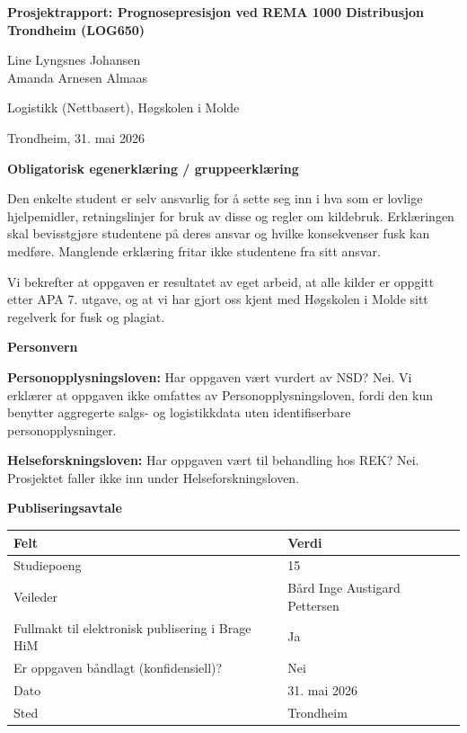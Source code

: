 \documentclass[
  norsk,
  11pt,
  a4paper,
]{article}
\author{}
\date{}
\newcounter{none} %
\begin{document}
\begin{titlepage}
\centering
\vspace*{3cm}
{\LARGE\bfseries Prosjektrapport: Prognosepresisjon ved REMA 1000 Distribusjon Trondheim (LOG650)\par}
\vspace{2.5cm}
{\large Line Lyngsnes Johansen \\ Amanda Arnesen Almaas\par}
\vspace{1cm}
{\large Logistikk (Nettbasert), Høgskolen i Molde\par}
\vspace{0.5cm}
{\large Trondheim, 31. mai 2026\par}
\vfill
\end{titlepage}

\textbf{Obligatorisk egenerklæring / gruppeerklæring}

Den enkelte student er selv ansvarlig for å sette seg inn i hva som er
lovlige hjelpemidler, retningslinjer for bruk av disse og regler om
kildebruk. Erklæringen skal bevisstgjøre studentene på deres ansvar og
hvilke konsekvenser fusk kan medføre. Manglende erklæring fritar ikke
studentene fra sitt ansvar.

Vi bekrefter at oppgaven er resultatet av eget arbeid, at alle kilder er
oppgitt etter APA 7. utgave, og at vi har gjort oss kjent med Høgskolen
i Molde sitt regelverk for fusk og plagiat.

\textbf{Personvern}

\textbf{Personopplysningsloven:} Har oppgaven vært vurdert av NSD? Nei.
Vi erklærer at oppgaven ikke omfattes av Personopplysningsloven, fordi
den kun benytter aggregerte salgs- og logistikkdata uten identifiserbare
personopplysninger.

\textbf{Helseforskningsloven:} Har oppgaven vært til behandling hos REK?
Nei. Prosjektet faller ikke inn under Helseforskningsloven.

\textbf{Publiseringsavtale}

{\def\LTcaptype{none} %
\begin{longtable}[]{@{}ll@{}}
\toprule\noalign{}
Felt & Verdi \\
\midrule\noalign{}
\endhead
\bottomrule\noalign{}
\endlastfoot
Studiepoeng & 15 \\
Veileder & Bård Inge Austigard Pettersen \\
Fullmakt til elektronisk publisering i Brage HiM & Ja \\
Er oppgaven båndlagt (konfidensiell)? & Nei \\
Dato & 31. mai 2026 \\
Sted & Trondheim \\
\end{longtable}
}
\end{document}
